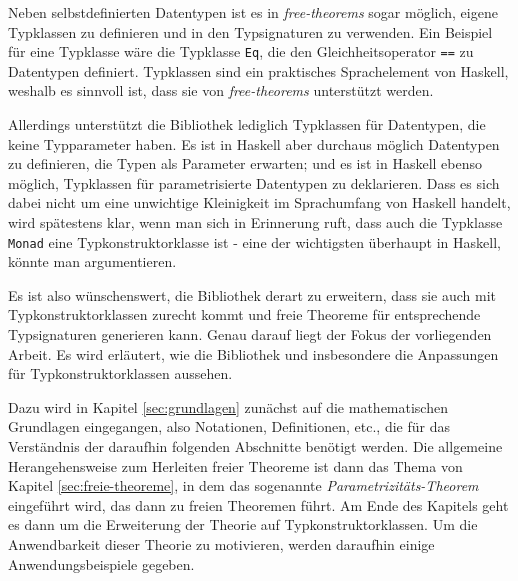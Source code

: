 Neben selbstdefinierten Datentypen ist es in \textit{free-theorems} sogar möglich, eigene Typklassen zu definieren und in
den Typsignaturen zu verwenden. Ein Beispiel für eine Typklasse wäre die Typklasse \texttt{Eq}, die den Gleichheitsoperator
\texttt{==} zu Datentypen definiert. Typklassen sind ein praktisches Sprachelement von Haskell, weshalb es sinnvoll ist,
dass sie von \textit{free-theorems} unterstützt werden.

Allerdings unterstützt die Bibliothek lediglich Typklassen für Datentypen, die keine Typparameter haben. Es ist in Haskell aber
durchaus möglich Datentypen zu definieren, die Typen als Parameter erwarten; und es ist in Haskell ebenso möglich, Typklassen
für parametrisierte Datentypen zu deklarieren.
Dass es sich dabei nicht um eine unwichtige Kleinigkeit im Sprachumfang von Haskell handelt, wird spätestens klar, wenn man
sich in Erinnerung ruft, dass auch die Typklasse \texttt{Monad} eine Typkonstruktorklasse ist - eine der wichtigsten überhaupt
in Haskell, könnte man argumentieren.

Es ist also wünschenswert, die Bibliothek derart zu erweitern, dass sie auch mit Typkonstruktorklassen zurecht kommt und
freie Theoreme für entsprechende Typsignaturen generieren kann. Genau darauf liegt der Fokus der vorliegenden Arbeit. Es wird
erläutert, wie die Bibliothek und insbesondere die Anpassungen für Typkonstruktorklassen aussehen.

Dazu wird in Kapitel \ref{sec:grundlagen} zunächst auf die mathematischen Grundlagen eingegangen, also Notationen, Definitionen,
etc., die für das Verständnis der daraufhin folgenden Abschnitte benötigt werden.
Die allgemeine Herangehensweise zum Herleiten freier Theoreme ist dann das Thema von Kapitel \ref{sec:freie-theoreme}, in dem
das sogenannte \textit{Parametrizitäts-Theorem} eingeführt wird, das dann zu freien Theoremen führt.
Am Ende des Kapitels geht es dann um die Erweiterung der Theorie auf Typkonstruktorklassen. Um die Anwendbarkeit dieser
Theorie zu motivieren, werden daraufhin einige Anwendungsbeispiele gegeben.



